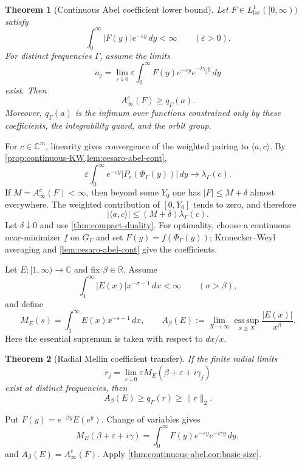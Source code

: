 \documentclass[12pt,a4paper,twoside]{extarticle}
\makeatletter
\theoremstyle{compactplain}
\newtheorem{theorem}{Theorem}[section]
\theoremstyle{compactdef}
\renewenvironment{proof}[1][\proofname]{\par\pushQED{\qed}\normalfont
  \topsep2pt\trivlist\item[\hskip\labelsep\bfseries #1\@addpunct{.}]\ignorespaces}
 {\popQED\endtrivlist\@endpefalse}
\makeatother
\begin{document}
\begin{theorem}[Continuous Abel coefficient lower bound]\label{thm:continuous-abel}
Let $F\in L^1_{\mathrm{loc}}([0,\infty))$ satisfy
\[
 \int_0^\infty|F(y)|e^{-\varepsilon y}\,dy<\infty
 \qquad(\varepsilon>0).
\]
For distinct frequencies $\Gamma$, assume the limits
\[
 a_j=\lim_{\varepsilon\downarrow0}
 \varepsilon\int_0^\infty F(y)e^{-\varepsilon y}e^{-i\gamma_jy}\,dy
\]
exist.  Then
\[
 A_\infty^c(F)\ge q_\Gamma(a).
\]
Moreover, $q_\Gamma(a)$ is the infimum over functions constrained only by these coefficients, the integrability guard, and the orbit group.
\end{theorem}
\begin{proof}
For $c\in\mathbb C^m$, linearity gives convergence of the weighted pairing to $\langle a,c\rangle$.  By \cref{prop:continuous-KW,lem:cesaro-abel-cont},
\[
 \varepsilon\int_0^\infty e^{-\varepsilon y}|P_c(\Phi_\Gamma(y))|\,dy
 \to\lambda_\Gamma(c).
\]
If $M=A_\infty^c(F)<\infty$, then beyond some $Y_0$ one has $|F|\le M+\delta$ almost everywhere.  The weighted contribution of $[0,Y_0]$ tends to zero, and therefore
\[
 |\langle a,c\rangle|\le(M+\delta)\lambda_\Gamma(c).
\]
Let $\delta\downarrow0$ and use \cref{thm:compact-duality}.  For optimality, choose a continuous near-minimizer $f$ on $G_\Gamma$ and set $F(y)=f(\Phi_\Gamma(y))$; Kronecker--Weyl averaging and \cref{lem:cesaro-abel-cont} give the coefficients.
\end{proof}

Let $E:[1,\infty)\to\mathbb C$ and fix $\beta\in\mathbb R$.  Assume
\[
 \int_1^\infty|E(x)|x^{-\sigma-1}\,dx<\infty
 \qquad(\sigma>\beta),
\]
and define
\[
 M_E(s)=\int_1^\infty E(x)x^{-s-1}\,dx,
 \qquad
 A_\beta(E):=\lim_{X\to\infty}
 \operatorname*{ess\,sup}_{x\ge X}\frac{|E(x)|}{x^\beta}.
\]
Here the essential supremum is taken with respect to $dx/x$.

\begin{theorem}[Radial Mellin coefficient transfer]\label{thm:mellin-transfer}
If the finite radial limits
\[
 r_j=\lim_{\varepsilon\downarrow0}
 \varepsilon M_E(\beta+\varepsilon+i\gamma_j)
\]
exist at distinct frequencies, then
\[
 A_\beta(E)\ge q_\Gamma(r)\ge\|r\|_2.
\]
\end{theorem}
\begin{proof}
Put $F(y)=e^{-\beta y}E(e^y)$.  Change of variables gives
\[
 M_E(\beta+\varepsilon+i\gamma)
 =\int_0^\infty F(y)e^{-\varepsilon y}e^{-i\gamma y}\,dy,
\]
and $A_\beta(E)=A_\infty^c(F)$.  Apply \cref{thm:continuous-abel,cor:basic-size}.
\end{proof}
\end{document}
